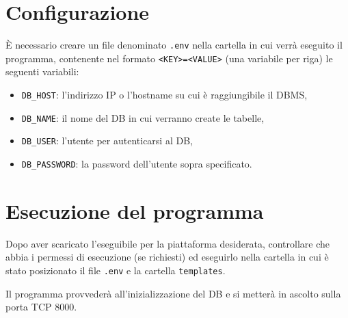 \documentclass[a4paper,12pt]{report}
\begin{document}
	\section{Configurazione}
	\par \`E necessario creare un file denominato \texttt{.env} nella cartella in cui verrà eseguito il programma, contenente nel formato \texttt{<KEY>=<VALUE>} (una variabile per riga) le seguenti variabili:
	\begin{itemize}
		\item \texttt{DB\_HOST}: l'indirizzo IP o l'hostname su cui è raggiungibile il DBMS,
		\item \texttt{DB\_NAME}: il nome del DB in cui verranno create le tabelle,
		\item \texttt{DB\_USER}: l'utente per autenticarsi al DB,
		\item \texttt{DB\_PASSWORD}: la password dell'utente sopra specificato.
	\end{itemize}
	\section{Esecuzione del programma}
	\par Dopo aver scaricato l'eseguibile per la piattaforma desiderata, controllare che abbia i permessi di esecuzione (se richiesti) ed eseguirlo nella cartella in cui è stato posizionato il file \texttt{.env} e la cartella \texttt{templates}.
	\par Il programma provvederà all'inizializzazione del DB e si metterà in ascolto sulla porta TCP 8000.
    \listoffigures
\end{document}
